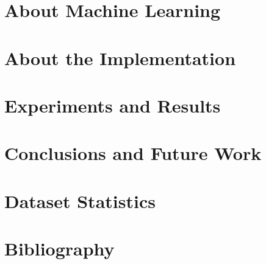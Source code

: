 \documentclass[12pt, twoside, openright]{book}
\begin{document}
\chapter{About Machine Learning} \label{about-ml}


\chapter{About the Implementation}\label{implementation}


\chapter{Experiments and Results}\label{experiments}


\chapter{Conclusions and Future Work}\label{conclusion}


\appendix



\chapter{Dataset Statistics} \label{ds-stats} %


\chapter{Bibliography}
\printbibliography
\end{document}
